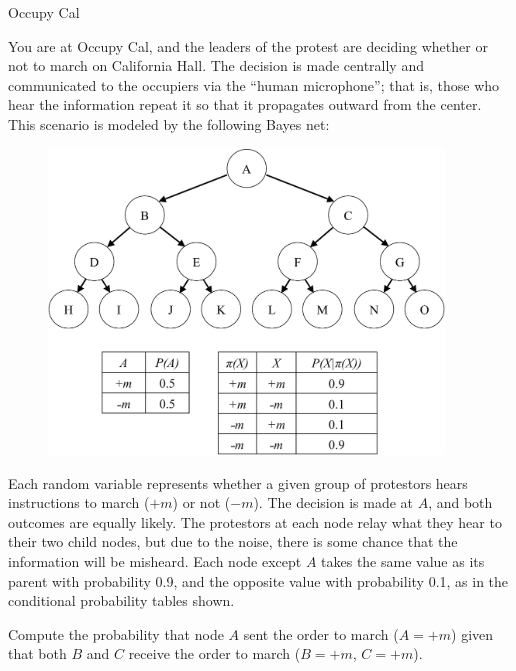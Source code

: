 \begin{problem}[]{Occupy Cal}

You are at Occupy Cal, and the leaders of the protest are deciding whether or not to march on California Hall. The decision is made centrally and communicated to the occupiers via the ``human microphone''; that is, those who hear the information repeat it so that it propagates outward from the center. This scenario is modeled by the following Bayes net:

\vspace{2mm}
\begin{figure}[htp]
\centering
\includegraphics[width=105mm]{figures/tree-labeled-tables-crop.pdf}
\end{figure}
\vspace{2mm}

Each random variable represents whether a given group of protestors hears instructions to march ($+m$) or not ($-m$). The decision is made at $A$, and both outcomes are equally likely. The protestors at each node relay what they hear to their two child nodes, but due to the noise, there is some chance that the information will be misheard. Each node except $A$ takes the same value as its parent with probability 0.9, and the opposite value with probability 0.1, as in the conditional probability tables shown.

\begin{question}[4] Compute the probability that node $A$ sent the order to march ($A = +m$) given that both $B$ and $C$ receive the order to march ($B=+m$, $C=+m$). \\
\fbox{\begin{minipage}[t][4cm][t]{17cm}
\OneA
\end{minipage}}
\end{question}


\end{problem}
